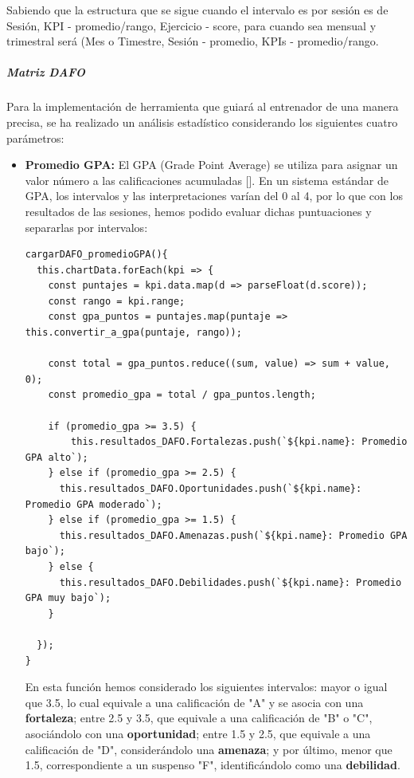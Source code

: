 Sabiendo que la estructura que se sigue cuando el intervalo es por sesión es de Sesión, KPI - promedio/rango, Ejercicio - score, para cuando sea mensual y trimestral será (Mes o Timestre, Sesión - promedio, KPIs - promedio/rango.

\subparagraph{Matriz DAFO}
Para la implementación de herramienta que guiará al entrenador de una manera precisa, se ha realizado un análisis estadístico considerando los siguientes cuatro parámetros:
\begin{itemize}
	\item \textbf{Promedio GPA:} El GPA (Grade Point Average) se utiliza para asignar un valor número a las calificaciones acumuladas [\cite{def_gpa}]. En un sistema estándar de GPA, los intervalos y las interpretaciones varían del 0 al 4, por lo que con los resultados de las sesiones, hemos podido evaluar dichas puntuaciones y separarlas por intervalos:

\begin{lstlisting}[style=Javascript-color, caption={Función DAFO - GPA},label=Javascript-color_code_gpa]
cargarDAFO_promedioGPA(){
  this.chartData.forEach(kpi => {
    const puntajes = kpi.data.map(d => parseFloat(d.score));
    const rango = kpi.range;
    const gpa_puntos = puntajes.map(puntaje => this.convertir_a_gpa(puntaje, rango));

    const total = gpa_puntos.reduce((sum, value) => sum + value, 0);
    const promedio_gpa = total / gpa_puntos.length;

    if (promedio_gpa >= 3.5) {
        this.resultados_DAFO.Fortalezas.push(`${kpi.name}: Promedio GPA alto`);
    } else if (promedio_gpa >= 2.5) {
      this.resultados_DAFO.Oportunidades.push(`${kpi.name}: Promedio GPA moderado`);
    } else if (promedio_gpa >= 1.5) {
      this.resultados_DAFO.Amenazas.push(`${kpi.name}: Promedio GPA bajo`);
    } else {
      this.resultados_DAFO.Debilidades.push(`${kpi.name}: Promedio GPA muy bajo`);
    }

  });
}
\end{lstlisting}

En esta función hemos considerado los siguientes intervalos: mayor o igual que 3.5, lo cual equivale a una calificación de "A" y se asocia con una \textbf{fortaleza}; entre 2.5 y 3.5, que equivale a una calificación de "B" o "C", asociándolo con una \textbf{oportunidad}; entre 1.5 y 2.5, que equivale a una calificación de "D", considerándolo una \textbf{amenaza}; y por último, menor que 1.5, correspondiente a un suspenso "F", identificándolo como una \textbf{debilidad}.


\end{itemize}
